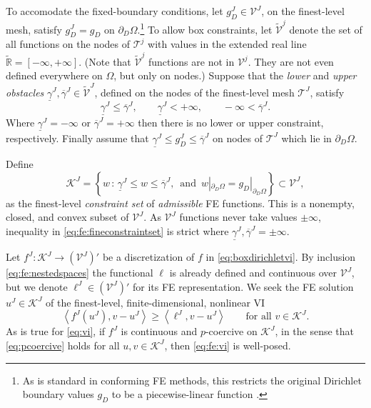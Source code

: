 \documentclass[letterpaper,final,12pt,reqno]{amsart}
\theoremstyle{cstyle}
\theoremstyle{cstyle*}
\theoremstyle{dstyle}
\numberwithin{equation}{section}
\numberwithin{figure}{section}
\numberwithin{table}{section}
\numberwithin{theorem}{section}
\newcommand{\RR}{\mathbb{R}}
\newcommand{\cK}{\mathcal{K}}
\newcommand{\ip}[2]{\left<#1,#2\right>}
\begin{document}
To accomodate the fixed-boundary conditions, let $g_D^J \in \mathcal{V}^J$, on the finest-level mesh, satisfy $g_D^J = g_D$ on $\partial_D \Omega$.\footnote{As is standard in conforming FE methods, this restricts the original Dirichlet boundary values $g_D$ to be a piecewise-linear function \cite{Elmanetal2014}.}  To allow box constraints, let $\tilde{\mathcal{V}}^j$ denote the set of all functions on the nodes of $\mathcal{T}^j$ with values in the extended real line $\tilde{\RR} = [-\infty,+\infty]$.  (Note that $\tilde{\mathcal{V}}^j$ functions are not in $\mathcal{V}^j$.  They are not even defined everywhere on $\Omega$, but only on nodes.)  Suppose that the \emph{lower} and \emph{upper obstacles} $\underline{\gamma}^J, \overline{\gamma}^J \in \tilde{\mathcal{V}}^J$, defined on the nodes of the finest-level mesh $\mathcal{T}^J$, satisfy
\begin{equation}
\underline{\gamma}^J \le \overline{\gamma}^J, \qquad \underline{\gamma}^J < +\infty, \qquad -\infty < \overline{\gamma}^J. \label{eq:fe:boxconstraintrequirements}
\end{equation}
Where $\underline{\gamma}^J=-\infty$ or $\overline{\gamma}^J=+\infty$ then there is no lower or upper constraint, respectively.  Finally assume that $\underline{\gamma}^J \le g_D^J \le \overline{\gamma}^J$ on nodes of $\mathcal{T}^J$ which lie in $\partial_D \Omega$.

Define
\begin{equation}
\mathcal{K}^J = \left\{w\,:\,\underline{\gamma}^J \le w \le \overline{\gamma}^J, \, \text{ and } \, w|_{\partial_D\Omega} = g_D|_{\partial_D\Omega}\right\} \subset \mathcal{V}^J, \label{eq:fe:fineconstraintset}
\end{equation}
as the finest-level \emph{constraint set} of \emph{admissible} FE functions.  This is a nonempty, closed, and convex subset of $\mathcal{V}^J$.  As $\mathcal{V}^J$ functions never take values $\pm\infty$, inequality in \eqref{eq:fe:fineconstraintset} is strict where $\underline{\gamma}^J, \overline{\gamma}^J = \pm \infty$.

Let $f^J:\mathcal{K}^J \to (\mathcal{V}^J)'$ be a discretization of $f$ in \eqref{eq:boxdirichletvi}.  By inclusion \eqref{eq:fe:nestedspaces} the functional $\ell$ is already defined and continuous over $\mathcal{V}^J$, but we denote $\ell^J \in (\mathcal{V}^J)'$ for its FE representation.  We seek the FE solution $u^J \in \mathcal{K}^J$ of the finest-level, finite-dimensional, nonlinear VI
\begin{equation}
\ip{f^J(u^J)}{v-u^J} \ge \ip{\ell^J}{v-u^J} \qquad \text{for all } v\in \cK^J. \label{eq:fe:vi}
\end{equation}
As is true for \eqref{eq:vi}, if $f^J$ is continuous and $p$-coercive on $\mathcal{K}^J$, in the sense that \eqref{eq:pcoercive} holds for all $u,v \in \mathcal{K}^J$, then \eqref{eq:fe:vi} is well-posed.
\end{document}

